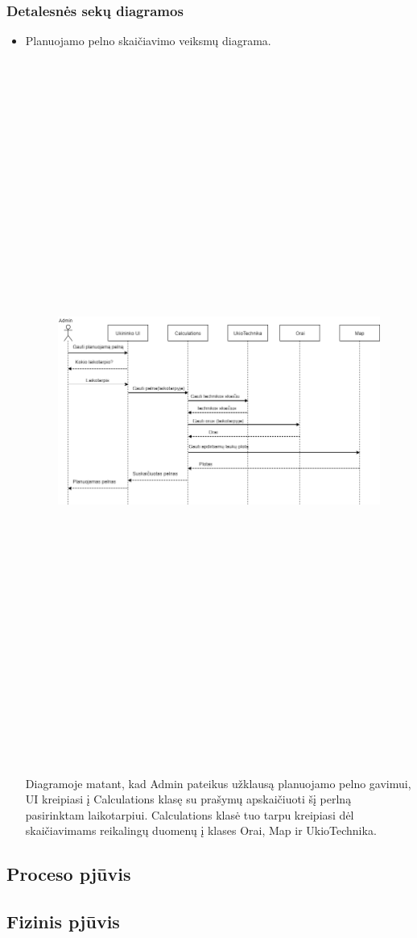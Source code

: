 \documentclass[oneside]{VUMIFPSkursinis}
\begin{document}
\subsubsection{Detalesnės sekų diagramos}
\begin{itemize}
\item Planuojamo pelno skaičiavimo veiksmų diagrama.
		\begin{figure}[H]
		\centering	
	\includegraphics[width=18cm,height=23cm,keepaspectratio]{PelnoSkaičiavimas.png}
	\caption{}
	\label{fig:PelnoSkaičiavimas}
\end{figure}
Diagramoje matant, kad Admin pateikus užklausą planuojamo pelno gavimui, UI kreipiasi į Calculations klasę su prašymų apskaičiuoti šį perlną pasirinktam laikotarpiui. Calculations klasė tuo tarpu kreipiasi dėl skaičiavimams reikalingų duomenų į klases Orai, Map ir UkioTechnika. 
\end{itemize}
\subsection{Proceso pjūvis}
\subsection{Fizinis pjūvis}



\end{document}
